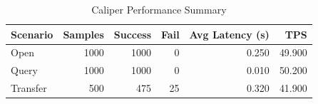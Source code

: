 \begin{table}
\caption{Caliper Performance Summary}
\label{tab:caliper_round}
\begin{tabular}{lrrrrr}
\toprule
Scenario & Samples & Success & Fail & Avg Latency (s) & TPS \\
\midrule
Open & 1000 & 1000 & 0 & 0.250 & 49.900 \\
Query & 1000 & 1000 & 0 & 0.010 & 50.200 \\
Transfer & 500 & 475 & 25 & 0.320 & 41.900 \\
\bottomrule
\end{tabular}
\end{table}
